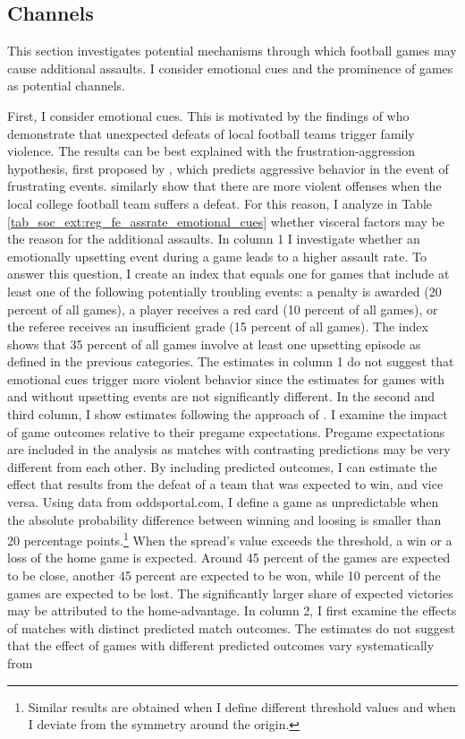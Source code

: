 \subsection{Channels}
This section investigates potential mechanisms through which football games may cause additional assaults. I consider emotional cues and the prominence of games as potential channels.



First, I consider emotional cues. This is motivated by the findings of \cite{card2011family} who demonstrate that unexpected defeats of local football teams trigger family violence. The results can be best explained with the frustration-aggression hypothesis, first proposed by \cite{dollard1939frustration}, which predicts aggressive behavior in the event of frustrating events. \cite{rees2009college} similarly show that there are more violent offenses when the local college football team suffers a defeat. For this reason, I analyze in Table \ref{tab_soc_ext:reg_fe_assrate_emotional_cues} whether visceral factors may be the reason for the additional assaults. In column 1 I investigate whether an emotionally upsetting event during a game leads to a higher assault rate. To answer this question, I create an index that equals one for games that include at least one of the following potentially troubling events: a penalty is awarded (20 percent of all games), a player receives a red card (10 percent of all games), or the referee receives an insufficient grade (15 percent of all games). The index shows that 35 percent of all games involve at least one upsetting episode as defined in the previous categories. The estimates in column 1 do not suggest that emotional cues trigger more violent behavior since the estimates for games with and without upsetting events are not significantly different. In the second and third column, I show estimates following the approach of \cite{card2011family}. I examine the impact of game outcomes relative to their pregame expectations. Pregame expectations are included in the analysis as matches with contrasting predictions may be very different from each other. By including predicted outcomes, I can estimate the effect that results from the defeat of a team that was expected to win, and vice versa. Using data from oddsportal.com, I define a game as unpredictable when the absolute probability difference between winning and loosing is smaller than 20 percentage points.\footnote{Similar results are obtained when I define different threshold values and when I deviate from the symmetry around the origin.} When the spread's value exceeds the threshold, a win or a loss of the home game is expected. Around 45 percent of the games are expected to be close, another 45 percent are expected to be won, while 10 percent of the games are expected to be lost. The significantly larger share of expected victories may be attributed to the home-advantage. In column 2, I first examine the effects of matches with distinct predicted match outcomes. The estimates do not suggest that the effect of games with different predicted outcomes vary systematically from 